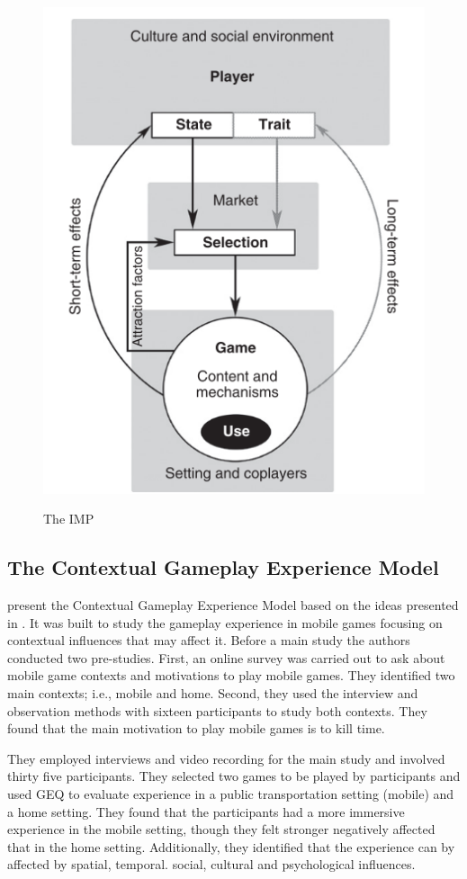 \begin{figure}[bth]
\myfloatalign
{\includegraphics[width=.6\linewidth]{gfx/ref_framework/IMP_Model}} \quad
\caption[The \ac{IMP}]{The \ac{IMP} \autocite{Elson2014}}\label{fig:IMP_Model}
\end{figure}

\subsection{The Contextual Gameplay Experience Model}
\textcite{Engl2013} present the Contextual Gameplay Experience Model based on the ideas presented in \autocite{Nackea2,Nacked}. It was built to study the gameplay experience in mobile games focusing on contextual influences that may affect it. Before a main study the authors conducted two pre-studies. First, an online survey was carried out to ask about mobile game contexts and motivations to play mobile games. They identified two main contexts; i.e., mobile and home. Second, they used the interview and observation methods with sixteen participants to study both contexts. They found that the main motivation to play mobile games is to kill time.

They employed interviews and video recording for the main study and involved thirty five participants. They selected two games to be played by participants and used \ac{GEQ} to evaluate experience in a public transportation setting (mobile) and a home setting. They found that the participants had a more immersive experience in the mobile setting, though they felt stronger negatively affected that in the home setting. Additionally, they identified that the experience can by affected by spatial, temporal. social, cultural and psychological influences.

